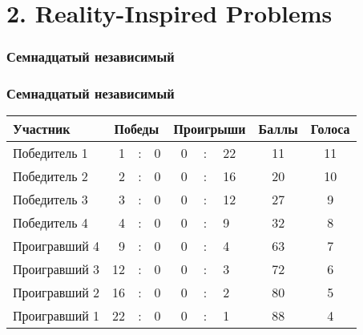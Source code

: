 \section[Задачи, вдохновлённые реальностью]{2. Reality-Inspired Problems}

\begin{frame} \frametitle{Семнадцатый независимый}


\end{frame}

\begin{frame} \frametitle{Семнадцатый независимый}

\newcommand{\vs}{&\hspace{-3mm}:&\hspace{-3mm}}
\begin{center} \begin{tabular}{|l|rcl|rcl|c|c|}
	\hline
	Участник & \multicolumn{3}{c|}{Победы}
		& \multicolumn{3}{c|}{Проигрыши}
		& Баллы & Голоса \\ \hline \hline
	Победитель 1 & 1 \vs 0 & 0 \vs 22 & 11 & 11 \\ \hline
	Победитель 2 & 2 \vs 0 & 0 \vs 16 & 20 & 10 \\ \hline
	Победитель 3 & 3 \vs 0 & 0 \vs 12 & 27 & 9 \\ \hline
	Победитель 4 & 4 \vs 0 & 0 \vs 9 & 32 & 8 \\ \hline \hline
	Проигравший 4 & 9 \vs 0 & 0 \vs 4 & 63 & 7 \\ \hline
	Проигравший 3 & 12 \vs 0 & 0 \vs 3 & 72 & 6 \\ \hline
	Проигравший 2 & 16 \vs 0 & 0 \vs 2 & 80 & 5 \\ \hline
	Проигравший 1 & 22 \vs 0 & 0 \vs 1 & 88 & 4 \\ \hline
\end{tabular} \end{center}

\end{frame}


